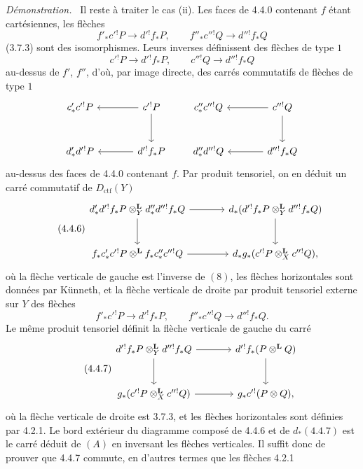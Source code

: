 \documentclass[11pt]{article}
\newenvironment{prooftext}[1][Proof]{\par\noindent\emph{#1.}\ }{\par\medskip}
\providecommand{\Dctf}{D_{\mathrm{ctf}}}
\providecommand{\Dctf}{D_{\mathrm{ctf}}}
\begin{document}
\begin{prooftext}[Démonstration]
Il reste à traiter le cas (ii). Les faces de 4.4.0 contenant $f$ étant cartésiennes, les flèches
\[
f'_*c'{}^!P\longrightarrow d'{}^!f_*P,\qquad
f''_*c''{}^!Q\longrightarrow d''{}^!f_*Q
\]
(3.7.3) sont des isomorphismes. Leurs inverses définissent des flèches de type $1$
\[
c'{}^!P\longrightarrow d'{}^!f_*P,\qquad
c''{}^!Q\longrightarrow d''{}^!f_*Q
\]
au-dessus de $f'$, $f''$, d'où, par image directe, des carrés commutatifs de flèches de type $1$
\[
\begin{tikzcd}[column sep=large,row sep=large]
c'_*c'{}^!P & c'{}^!P\arrow[l]\arrow[d]\\
d'_*d'{}^!P & d'{}^!f_*P\arrow[l]
\end{tikzcd}
\qquad
\begin{tikzcd}[column sep=large,row sep=large]
c''_*c''{}^!Q & c''{}^!Q\arrow[l]\arrow[d]\\
d''_*d''{}^!Q & d''{}^!f_*Q\arrow[l]
\end{tikzcd}
\]
au-dessus des faces de 4.4.0 contenant $f$. Par produit tensoriel, on en déduit un carré commutatif de $\Dctf(Y)$
\begin{equation}
\tag{4.4.6}
\begin{tikzcd}[column sep=large,row sep=large]
d'_*d'{}^!f_*P\otimes_Y^{\mathbf L}d''_*d''{}^!f_*Q
 \arrow[r]\arrow[d] &
d_*(d'{}^!f_*P\otimes_Y^{\mathbf L}d''{}^!f_*Q)\arrow[d]\\
f_*c'_*c'{}^!P\otimes^{\mathbf L}f_*c''_*c''{}^!Q
 \arrow[r] &
d_*g_*(c'{}^!P\otimes_X^{\mathbf L}c''{}^!Q),
\end{tikzcd}
\end{equation}
où la flèche verticale de gauche est l'inverse de $(8)$, les flèches horizontales sont données par Künneth, et la flèche verticale de droite par produit tensoriel externe sur $Y$ des flèches
\[
f'_*c'{}^!P\longrightarrow d'{}^!f_*P,\qquad
f''_*c''{}^!Q\longrightarrow d''{}^!f_*Q.
\]
Le même produit tensoriel définit la flèche verticale de gauche du carré
\begin{equation}
\tag{4.4.7}
\begin{tikzcd}[column sep=large,row sep=large]
d'{}^!f_*P\otimes_Y^{\mathbf L}d''{}^!f_*Q
 \arrow[r]\arrow[d] &
d'{}^!f_*(P\otimes^{\mathbf L}Q)\arrow[d]\\
g_*(c'{}^!P\otimes_X^{\mathbf L}c''{}^!Q)
 \arrow[r] &
g_*c'{}^!(P\otimes Q),
\end{tikzcd}
\end{equation}
où la flèche verticale de droite est 3.7.3, et les flèches horizontales sont définies par 4.2.1. Le bord extérieur du diagramme composé de 4.4.6 et de $d_*(4.4.7)$ est le carré déduit de $(A)$ en inversant les flèches verticales. Il suffit donc de prouver que 4.4.7 commute, en d'autres termes que les flèches 4.2.1

\end{prooftext}
\end{document}
